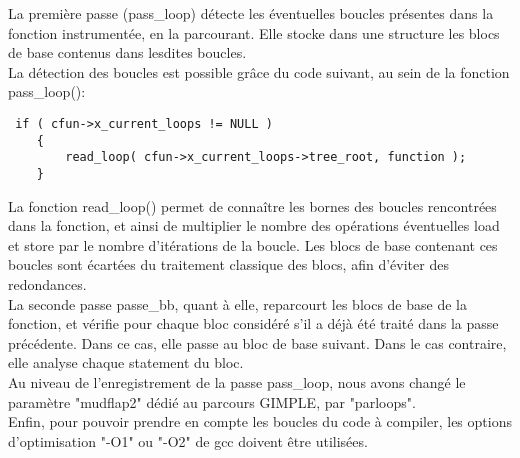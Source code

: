 La première passe (pass\_loop) détecte les éventuelles boucles présentes dans la fonction instrumentée, en la parcourant. Elle stocke dans une structure les blocs de base contenus dans lesdites boucles.\\
La détection des boucles est possible grâce du code suivant, au sein de la fonction pass\_loop():
\begin{verbatim} 
 if ( cfun->x_current_loops != NULL )
	{
	    read_loop( cfun->x_current_loops->tree_root, function );
	}
\end{verbatim}

La fonction read\_loop() permet de connaître les bornes des boucles rencontrées dans la fonction, et ainsi de multiplier le nombre des opérations éventuelles load et store par le nombre d'itérations de la boucle. Les blocs de base contenant ces boucles sont écartées du traitement classique des blocs, afin d'éviter des redondances.\\

La seconde passe passe\_bb, quant à elle, reparcourt les blocs de base de la fonction, et vérifie pour chaque bloc considéré s'il a déjà été traité dans la passe précédente. Dans ce cas, elle passe au bloc de base suivant. Dans le cas contraire, elle analyse chaque statement du bloc.\\ 

Au niveau de l'enregistrement de la passe pass\_loop, nous avons changé le paramètre "mudflap2" dédié au parcours GIMPLE, par "parloops".\\
Enfin, pour pouvoir prendre en compte les boucles du code à compiler, les options d'optimisation "-O1" ou "-O2" de gcc doivent être utilisées.


